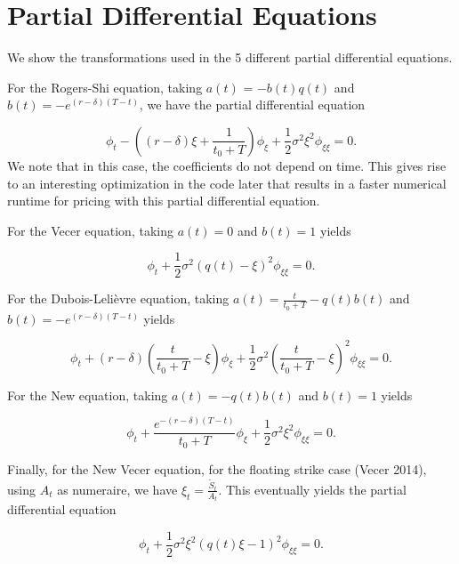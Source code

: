 \documentclass{article}
\begin{document}
\section{Partial Differential Equations}
We show the transformations used in the 5 different partial differential equations.

For the Rogers-Shi equation, taking \(a(t)\) = \(-b(t)q(t)\) and \(b(t) = -e^{(r-\delta)(T-t)}\), we have the partial differential equation

\begin{equation}
  \phi_t - ( (r-\delta)\xi + \frac{1}{t_0 + T} )\phi_\xi + \frac{1}{2}\sigma^2\xi^2\phi_{\xi\xi} = 0.
\end{equation}We note that in this case, the coefficients do not depend on time. This gives rise to an interesting optimization in the code later that results in a faster numerical runtime for pricing with this partial differential equation.

For the Vecer equation, taking \(a(t) = 0\) and \(b(t)=1\) yields

\begin{equation}
  \phi_t + \frac{1}{2}\sigma^2(q(t) - \xi)^2\phi_{\xi\xi} = 0.
\end{equation}

For the Dubois-Leli\`{e}vre equation, taking \(a(t) = \frac{t}{t_0 + T} - q(t)b(t)\) and \(b(t)=-e^{(r-\delta)(T-t)}\) yields

\begin{equation}
  \phi_t + (r-\delta)(\frac{t}{t_0 + T} - \xi)\phi_\xi + \frac{1}{2}\sigma^2(\frac{t}{t_0 + T} - \xi)^2\phi_{\xi\xi} = 0.
\end{equation}

For the New equation, taking \(a(t) = -q(t)b(t)\) and \(b(t) = 1\) yields

\begin{equation}
  \phi_t + \frac{e^{-(r-\delta)(T-t)}}{t_0 + T}\phi_\xi + \frac{1}{2}\sigma^2\xi^2\phi_{\xi\xi} = 0.
\end{equation}

Finally, for the New Vecer equation, for the floating strike case (Vecer 2014), using \(A_t\) as numeraire, we have \(\xi_t = \frac{\tilde{S}_t}{A_t}\). This eventually yields the partial differential equation %

\begin{equation}
  \phi_t + \frac{1}{2}\sigma^2\xi^2(q(t)\xi - 1)^2 \phi_{\xi\xi} = 0.
\end{equation}
\end{document}

